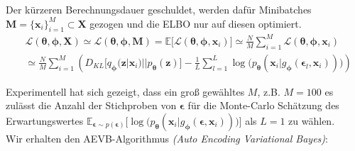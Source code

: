 \documentclass[12pt]{article}
\newcommand{\qenc}{q_{\boldsymbol\phi}(\mathbf{z}|\mathbf{x}_i)}
\newcommand{\z}{\mathbf{z}}
\begin{document}
	Der kürzeren Berechnungsdauer geschuldet, werden dafür Minibatches $\textbf{M} = \{\textbf{x}_{i}\}_{i=1}^{M} \subset \textbf{X}$ gezogen und die ELBO nur auf diesen optimiert.
	\begin{align*}
	&\mathcal{L}(\boldsymbol\theta,\boldsymbol\phi,\textbf{X}) \simeq \mathcal{L}(\boldsymbol\theta,\boldsymbol\phi,\textbf{M}) = \mathbb{E}\lbrack\mathcal{L}(\boldsymbol\theta,\boldsymbol\phi,\textbf{x}_{i})\rbrack \simeq \frac{N}{M}\sum_{i=1}^{M}\mathcal{L}(\boldsymbol\theta,\boldsymbol\phi,\textbf{x}_{i})\\
	&\simeq \frac{N}{M}\sum_{i=1}^{M}  \left(D_{KL}\big[\qenc||p_{\boldsymbol\theta}(\z)\big] - \frac{1}{L}\sum_{l=1}^{L}\log\big(p_{\boldsymbol\theta}(\textbf{x}_{i}|g_{\boldsymbol\phi}(\boldsymbol\epsilon_{l},\textbf{x}_{i}))\big)\right)
	\end{align*}
	
	Experimentell hat sich gezeigt, dass ein groß gewähltes $M$, z.B. $M=100$ es zulässt die Anzahl der Stichproben von $\boldsymbol\epsilon$ für die Monte-Carlo Schätzung des Erwartungswertes $\mathbb{E}_{\boldsymbol\epsilon\sim p(\boldsymbol\epsilon)}\big[\log\big(p_{\boldsymbol\theta}(\textbf{x}_{i}|g_{\boldsymbol\phi}(\boldsymbol\epsilon,\textbf{x}_{i}))\big)\big]$ als $L=1$ zu wählen.
	\\
	Wir erhalten den AEVB-Algorithmus \emph{(Auto Encoding Variational Bayes)}: \\
	
\end{document}
